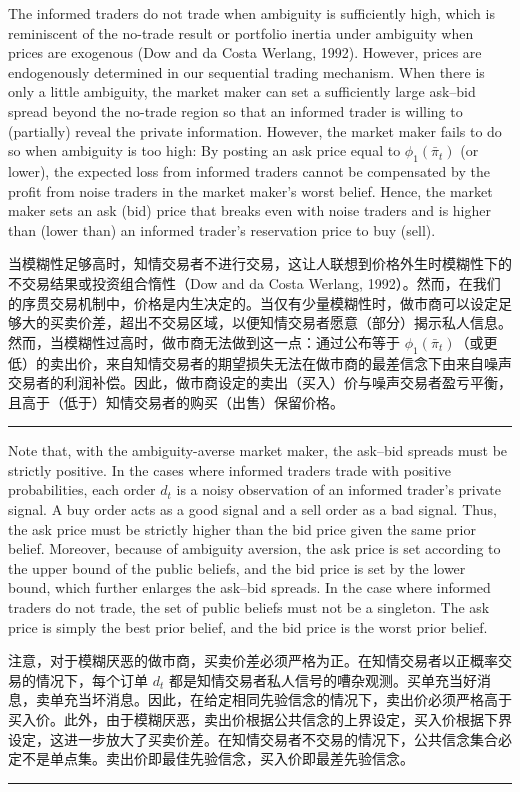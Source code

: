 \documentclass[12pt,a4paper]{article}
\newenvironment{original}{%
  \par\vspace{4pt}\noindent%
  \color{black}%
  \ignorespaces
}{%
  \par\vspace{2pt}%
}
\newenvironment{translation}{%
  \par\vspace{2pt}\noindent%
  \color{transblue}%
  \ignorespaces
}{%
  \par\vspace{4pt}\hrule\vspace{6pt}%
}
\begin{document}
\begin{original}
The informed traders do not trade when ambiguity is sufficiently high, which is reminiscent of the no-trade result or portfolio inertia under ambiguity when prices are exogenous (Dow and da Costa Werlang, 1992). However, prices are endogenously determined in our sequential trading mechanism. When there is only a little ambiguity, the market maker can set a sufficiently large ask--bid spread beyond the no-trade region so that an informed trader is willing to (partially) reveal the private information. However, the market maker fails to do so when ambiguity is too high: By posting an ask price equal to $\phi_1(\bar{\pi}_t)$ (or lower), the expected loss from informed traders cannot be compensated by the profit from noise traders in the market maker's worst belief. Hence, the market maker sets an ask (bid) price that breaks even with noise traders and is higher than (lower than) an informed trader's reservation price to buy (sell).
\end{original}
\begin{translation}
当模糊性足够高时，知情交易者不进行交易，这让人联想到价格外生时模糊性下的不交易结果或投资组合惰性（Dow and da Costa Werlang, 1992）。然而，在我们的序贯交易机制中，价格是内生决定的。当仅有少量模糊性时，做市商可以设定足够大的买卖价差，超出不交易区域，以便知情交易者愿意（部分）揭示私人信息。然而，当模糊性过高时，做市商无法做到这一点：通过公布等于 $\phi_1(\bar{\pi}_t)$（或更低）的卖出价，来自知情交易者的期望损失无法在做市商的最差信念下由来自噪声交易者的利润补偿。因此，做市商设定的卖出（买入）价与噪声交易者盈亏平衡，且高于（低于）知情交易者的购买（出售）保留价格。
\end{translation}

\begin{original}
Note that, with the ambiguity-averse market maker, the ask--bid spreads must be strictly positive. In the cases where informed traders trade with positive probabilities, each order $d_t$ is a noisy observation of an informed trader's private signal. A buy order acts as a good signal and a sell order as a bad signal. Thus, the ask price must be strictly higher than the bid price given the same prior belief. Moreover, because of ambiguity aversion, the ask price is set according to the upper bound of the public beliefs, and the bid price is set by the lower bound, which further enlarges the ask--bid spreads. In the case where informed traders do not trade, the set of public beliefs must not be a singleton. The ask price is simply the best prior belief, and the bid price is the worst prior belief.
\end{original}
\begin{translation}
注意，对于模糊厌恶的做市商，买卖价差必须严格为正。在知情交易者以正概率交易的情况下，每个订单 $d_t$ 都是知情交易者私人信号的嘈杂观测。买单充当好消息，卖单充当坏消息。因此，在给定相同先验信念的情况下，卖出价必须严格高于买入价。此外，由于模糊厌恶，卖出价根据公共信念的上界设定，买入价根据下界设定，这进一步放大了买卖价差。在知情交易者不交易的情况下，公共信念集合必定不是单点集。卖出价即最佳先验信念，买入价即最差先验信念。
\end{translation}
\end{document}
